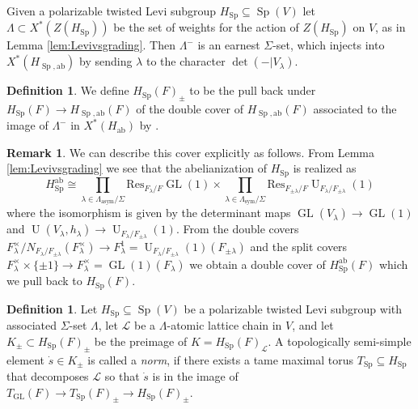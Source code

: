 \documentclass{article}
\def\mc#1{\mathcal{#1}}
\def\tx#1{\textrm{#1}}
\DeclareMathOperator{\Sp}{Sp}
\DeclareMathOperator{\GL}{GL}
\theoremstyle{definition}
\newtheorem{rem}[thm]{Remark}
\newtheorem{dfn}[thm]{Definition}
\numberwithin{equation}{subsection}
\renewcommand{\-}{\hyp{}}
\DeclareMathOperator{\U}{U}
\begin{document}
Given a polarizable twisted Levi subgroup $H_{\Sp} \subseteq \Sp(V)$ let $\Lambda \subset X^*(Z(H_{\Sp}))$ be the set of weights for the action of $Z(H_{\Sp})$ on $V$, as in Lemma \ref{lem:Levivsgrading}. Then $\Lambda^-$ is an earnest $\Sigma$-set, which injects into $X^*(H_{\Sp,\tx{ab}})$ by sending $\lambda$ to the character $\det(-|V_\lambda)$.

\begin{dfn} \label{dfn:tsl-cov}We define $H_{\Sp}(F)_\pm$ to be the pull back under $H_{\Sp}(F) \to H_{\Sp,\tx{ab}}(F)$ of the double cover of $H_{\Sp,\tx{ab}}(F)$ associated to the image of $\Lambda^-$ in $X^*(H_\tx{ab})$ by \cite[\S3.1]{KalDC}.
\end{dfn}

\begin{rem}
	We can describe this cover explicitly as follows. From Lemma \ref{lem:Levivsgrading} we see that the abelianization of $H_{\Sp}$ is realized as
	\[ 	H_{\Sp}^\tx{ab} \cong \prod_{\lambda \in \Lambda_\tx{asym}/\Sigma} \tx{Res}_{F_\lambda/F}\GL(1)
			\times\prod_{\lambda \in \Lambda_\tx{sym}/\Sigma} \tx{Res}_{F_{\pm\lambda}/F}\U_{F_\lambda/F_{\pm\lambda}}(1) \]
	where the isomorphism is given by the determinant maps $\GL(V_\lambda) \to \GL(1)$ and $\U(V_{\lambda},h_{\lambda}) \to \U_{F_\lambda/F_{\pm\lambda}}(1)$. From the double covers $F_\lambda^\times/N_{F_\lambda/F_{\pm\lambda}}(F_\lambda^\times) \to F_\lambda^1=\U_{F_\lambda/F_{\pm\lambda}}(1)(F_{\pm\lambda})$ and the split covers $F_\lambda^\times \times \{\pm1\} \to F_\lambda^\times=\GL(1)(F_\lambda)$ we obtain a double cover of $H_{\Sp}^\tx{ab}(F)$ which we pull back to $H_{\Sp}(F)$.
\end{rem}

\begin{dfn}\label{dfn:norm}
	Let $H_{\Sp} \subseteq \Sp(V)$ be a polarizable twisted Levi subgroup with associated $\Sigma$-set $\Lambda$, let $\mc{L}$ be a $\Lambda$-atomic lattice chain in $V$, and let $K_\pm \subset H_{\Sp}(F)_\pm$ be the preimage of $K=H_{\Sp}(F)_\mc{L}$.
A topologically semi-simple element $\dot s \in K_\pm$ is called a \emph{norm}, if there exists a tame maximal torus $T_{\Sp} \subseteq H_{\Sp}$ that decomposes $\mc{L}$ so that $\dot s$ is in the image of $T_{\GL}(F) \to T_{\Sp}(F)_\pm \to H_{\Sp}(F)_\pm$. \end{dfn}
\end{document}
